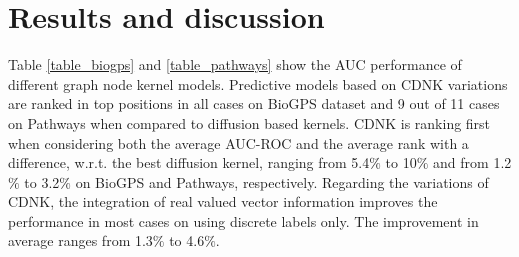 \documentclass[review]{elsarticle}
\begin{document}
\section{Results and discussion}
Table \ref{table_biogps} and \ref{table_pathways} show the AUC performance of different graph node kernel models. Predictive models based on CDNK variations are ranked in top positions in all cases on BioGPS dataset and 9 out of 11 cases on Pathways when compared to diffusion based kernels. CDNK is ranking first when considering both the average AUC-ROC and the average rank with a difference, w.r.t. the best diffusion kernel, ranging from 5.4$\%$ to 10$\%$ and from 1.2$\%$ to 3.2$\%$ on BioGPS and Pathways, respectively. Regarding the variations of CDNK, the integration of real valued vector information improves the performance in most cases on using discrete labels only. The improvement in average ranges from 1.3$\%$ to 4.6$\%$. 

\end{document}
